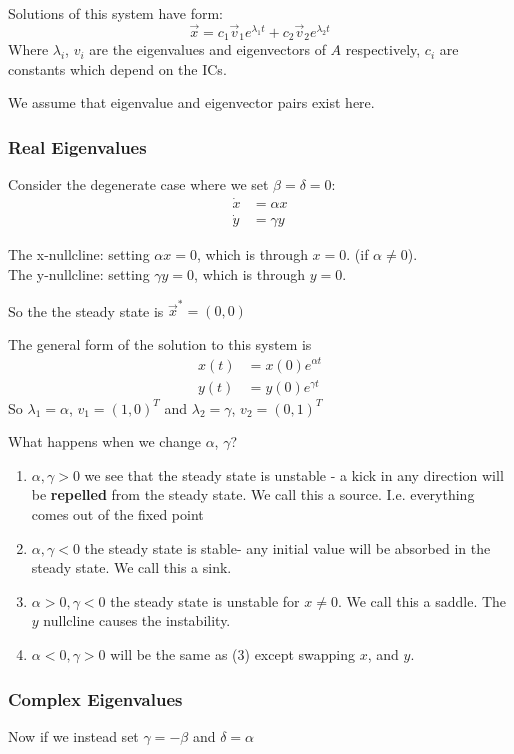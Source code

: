 \documentclass{X:/Documents/Coding/Latex/myassignment}
\begin{document}
Solutions of this system have form:
\[\vec x = c_1 \vec v_1 e^{\lambda_1 t} + c_2 \vec v_2 e^{\lambda_2 t}\]
Where $\lambda_i$, $v_i$ are the eigenvalues and eigenvectors of $A$ respectively, $c_i$ are constants which depend on the ICs.

We assume that eigenvalue and eigenvector pairs exist here.

\subsubsection{Real Eigenvalues}
Consider the degenerate case where we set $\beta = \delta = 0$:
\begin{align*}
    \dot x &= \alpha x\\
    \dot y &= \gamma y
\end{align*}

The x-nullcline: setting $\alpha x = 0$, which is through $x=0$. (if $\alpha\neq 0$).\\
The y-nullcline: setting $\gamma y = 0$, which is through $y=0$.

So the the steady state is $\vec x^* = (0,0)$

The general form of the solution to this system is
\begin{align*}
    x(t) &= x(0) e^{\alpha t}\\
    y(t) &= y(0) e^{\gamma t}
\end{align*}
So $\lambda_1 = \alpha$, $v_1 = (1,0)^T$ and $\lambda_2 = \gamma$, $v_2 = (0,1)^T$


What happens when we change $\alpha$, $\gamma$?
\begin{enumerate}
    \item $\alpha,\gamma >0$ we see that the steady state is unstable - a kick in any direction will be \textbf{repelled} from the steady state. We call this a source. I.e. everything comes out of the fixed point
    \item $\alpha,\gamma <0$ the steady state is stable- any initial value will be absorbed in the steady state. We call this a sink.
    \item $\alpha > 0, \gamma <0$ the steady state is unstable for $x\neq 0$. We call this a saddle. The $y$ nullcline causes the instability.
    \item $\alpha <0, \gamma >0$ will be the same as (3) except swapping $x$, and $y$.
\end{enumerate}

\subsubsection{Complex Eigenvalues}
Now if we instead set $\gamma = -\beta$ and $\delta = \alpha$
\end{document}
